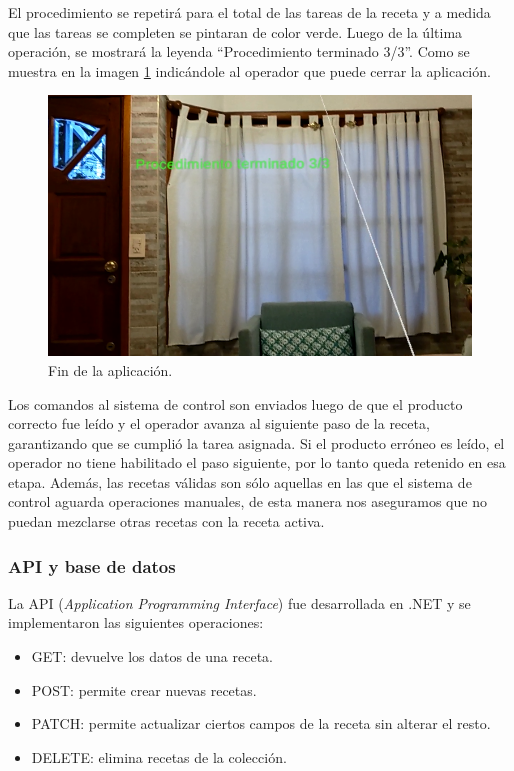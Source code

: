 El procedimiento se repetirá para el total de las tareas de la receta y a medida que las tareas se completen se pintaran de color verde. Luego de la última operación, se mostrará la leyenda ``Procedimiento terminado 3/3''. Como se muestra en la imagen \ref{fig:i18} indicándole al operador que puede cerrar la aplicación.

\begin{figure}[htpb]
	\centering
	\includegraphics[scale=.5]{./Figures/i18.PNG}
	\caption{Fin de la aplicación\protect\footnotemark.}
	\label{fig:i18}
\end{figure} 

\vspace{60px}
Los comandos al sistema de control son enviados luego de que el producto correcto fue leído y el operador avanza al siguiente paso de la receta, garantizando que se cumplió la tarea asignada. Si el producto erróneo es leído, el operador no tiene habilitado el paso siguiente, por lo tanto queda retenido en esa etapa. Además, las recetas válidas son sólo aquellas en las que el sistema de control aguarda operaciones manuales, de esta manera nos aseguramos que no puedan mezclarse otras recetas con la receta activa.

\subsubsection{API y base de datos}
La API (\textit{Application Programming Interface}) fue desarrollada en .NET y se implementaron las siguientes operaciones:

\begin{itemize}
\item GET: devuelve los datos de una receta.
\item POST: permite crear nuevas recetas.
\item PATCH: permite actualizar ciertos campos de la receta sin alterar el resto.
\item DELETE: elimina recetas de la colección.
\end{itemize}


